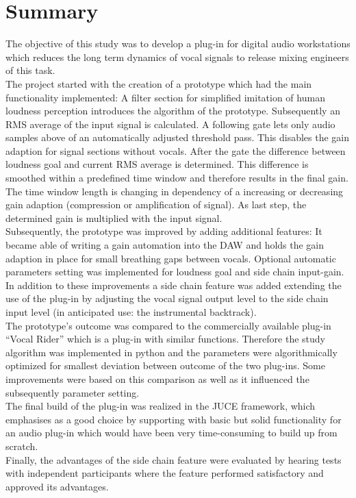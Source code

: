 \chapter{Summary}
\label{chapter:summary}

The objective of this study was to develop a plug-in for digital audio workstations which reduces the long term dynamics of vocal signals to release mixing engineers of this task.\\
The project started with the creation of a prototype which had the main functionality implemented: A filter section for simplified imitation of human loudness perception introduces the algorithm of the prototype. Subsequently an RMS average of the input signal is calculated. A following gate lets only audio samples above of an automatically adjusted threshold pass. This disables the gain adaption for signal sections without vocals. After the gate the difference between loudness goal and current RMS average is determined. This difference is smoothed within a predefined time window and therefore results in the final gain. The time window length is changing in dependency of a increasing or decreasing gain adaption (compression or amplification of signal). As last step, the determined gain is multiplied with the input signal.\\
Subsequently, the prototype was improved by adding additional features: It became able of writing a gain automation into the DAW and holds the gain adaption in place for small breathing gaps between vocals. Optional automatic parameters setting was implemented for loudness goal and side chain input-gain.\\
In addition to these improvements a side chain feature was added extending the use of the plug-in by adjusting the vocal signal output level to the side chain input level (in anticipated use: the instrumental backtrack).\\
The prototype's outcome was compared to the commercially available plug-in “Vocal Rider”\cite{VR} which is a plug-in with similar functions. Therefore the study algorithm was implemented in python and the parameters were algorithmically optimized for smallest deviation between outcome of the two plug-ins. Some improvements were based on this comparison as well as it influenced the subsequently parameter setting.\\
The final build of the plug-in was realized in the JUCE framework, which emphasises as a good choice by supporting with basic but solid functionality for an audio plug-in which would have been very time-consuming to build up from scratch.\\
Finally, the advantages of the side chain feature were evaluated by hearing tests with independent participants where the feature performed satisfactory and approved its advantages.\\

